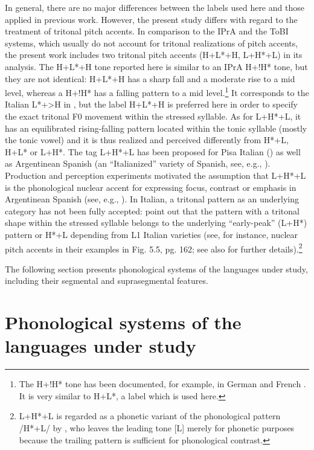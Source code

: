 In general, there are no major differences between the labels used here and those applied in previous work. However, the present study differs with regard to the treatment of tritonal pitch accents. In comparison to the IPrA and the ToBI systems, which usually do not account for tritonal realizations of pitch accents, the present work includes two tritonal pitch accents (H+L*+H, L+H*+L) in its analysis. The H+L*+H tone reported here is similar to an IPrA H+!H* tone, but they are not identical: H+L*+H has a sharp fall and a moderate rise to a mid level, whereas a H+!H* has a falling pattern to a mid level.\footnote{The H+!H* tone has been documented, for example, in German \citep{GriceEtAl2005a} and French \citep{Delais-RoussarieEtAl2015}. It is very similar to H+L*, a label which is used here.}  It corresponds to the Italian L*+>H in  \citet{GiliFivelaEtAl2015}, but the label H+L*+H is preferred here in order to specify the exact tritonal F0 movement within the stressed syllable. As for L+H*+L, it has an equilibrated rising-falling pattern located within the tonic syllable (mostly the tonic vowel) and it is thus realized and perceived differently from H*+L, H+L* or L+H*. The tag L+H*+L has been proposed for Pisa Italian (\citealt{GiliFivela2002,GiliFivela2004, PrietoEtAl2005}) as well as Argentinean Spanish (an “Italianized” variety of Spanish, see, e.g., \citealt{GabrielEtAl2010, GabrielKireva2014a}). Production and perception experiments motivated the assumption that L+H*+L is the phonological nuclear accent for expressing focus, contrast or emphasis in Argentinean Spanish (see, e.g., \citealt{GabrielEtAl2010, FeldhausenEtAl2011}). In Italian, a tritonal pattern as an underlying category has not been fully accepted:  \citet[148]{GiliFivelaEtAl2015} point out that the pattern with a tritonal shape within the stressed syllable belongs to the underlying ``early-peak'' (L+H*) pattern or H*+L depending from L1 Italian varieties (see, for instance, nuclear pitch accents in their examples in Fig. 5.5, pg. 162; see also  \citealt{GiliFivela2002,GiliFivela2004} for further details).\footnote{L+H*+L is regarded as a phonetic variant of the phonological pattern /H*+L/ by \citet{GiliFivela2002, GiliFivela2004}, who leaves the leading tone [L] merely for phonetic purposes because the trailing pattern is sufficient for phonological contrast.}


The following section presents phonological systems of the languages under study, including their segmental and suprasegmental features.


\section{Phonological systems of the languages under study}\label{sec:2.3}

